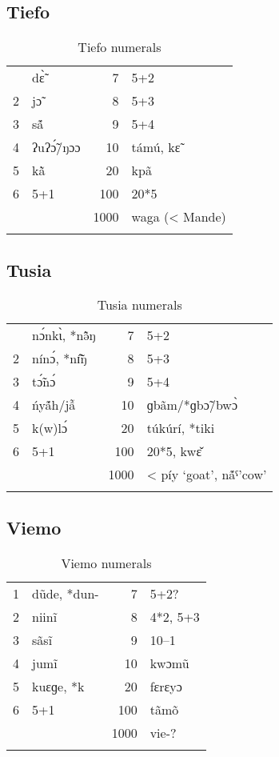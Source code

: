  
\subsection{Tiefo}%
\begin{table}
\caption{\label{tab:3:184}Tiefo numerals}
\begin{tabularx}{\textwidth}{lQrX}
 & d{\`{\~ɛ}} & 7 & 5+2\\
2 & j{\~{ɔ}} & 8 & 5+3\\
3 & s{\'ã} & 9 & 5+4\\
4 & ʔuʔ{\'{\~ɔ}}/ŋɔɔ & 10 & támú, k{\~{ɛ}}~\\
5 & k{\`ã} & 20 & kp{\~{a}}\\
6 & 5+1 & 100 & 20*5\\
&  & 1000 & waga (< Mande)\\
\lspbottomrule
\end{tabularx}
\end{table}

\largerpage[2]

\subsection{Tusia}%
\begin{table}
\caption{\label{tab:3:185}Tusia numerals}
\begin{tabularx}{\textwidth}{lQrX}
 & n{\'{ɔ}}nk{\`{ɩ}}, *n{\~{\^ə}}ŋ & 7 & 5+2\\
2 & nín{\'{ɔ}}, *n{\~{\^ɪ}}ŋ & 8 & 5+3\\
3 & t{\'{\~ɔ}}n{\'{ɔ}} & 9 & 5+4\\
4 & {\'{n}}y{\'ã}h/j{\~{\^a}} & 10 & ɡb{\~{a}}m/*ɡb{\~{ɔ}}/bw{\`{ɔ}}\\
5 & k(w)l{\'{ɔ}} & 20 & túkúrí, *tiki\\
6 & 5+1 & 100 & 20*5, kw{\v{ɛ}}\\
&  & 1000 & < píy `goat’, n{\'ã}ˤ'cow'\\
\lspbottomrule
\end{tabularx}
\end{table}

 \clearpage
\subsection{Viemo}%
\begin{table}
\caption{\label{tab:3:186}Viemo numerals}


\begin{tabularx}{\textwidth}{lQrQ}
\lsptoprule

1 & d{\~{u}}de, *dun- & 7 & 5+2?\\
2 & niin{\~{i}} & 8 & 4*2, 5+3\\
3 & s{\~{a}}s{\~{i}} & 9 & 10--1\\
4 & jum{\~{i}} & 10 & kwɔm{\~{u}}\\
5 & kuɛɡe, *k{} & 20 & fɛrɛyɔ\\
6 & 5+1 & 100 & t{\~{a}}mõ\\
&  & 1000 & vie-?\\
\lspbottomrule
\end{tabularx}
\end{table}
 
